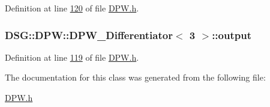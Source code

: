 Definition at line \hyperlink{_d_p_w_8h_source_l00120}{120} of file \hyperlink{_d_p_w_8h_source}{D\+P\+W.\+h}.

\hypertarget{class_d_s_g_1_1_d_p_w_1_1_d_p_w___differentiator_3_013_01_4_a09eeb701309aa1f1034964921417a904}{
\subsubsection[{output}]{ {\bf D\+S\+G\+::\+D\+P\+W\+::\+D\+P\+W\+\_\+\+Differentiator}$<$ 3 $>$\+::output\hspace{0.3cm}{\ttfamily [protected]}}}\label{class_d_s_g_1_1_d_p_w_1_1_d_p_w___differentiator_3_013_01_4_a09eeb701309aa1f1034964921417a904}


Definition at line \hyperlink{_d_p_w_8h_source_l00119}{119} of file \hyperlink{_d_p_w_8h_source}{D\+P\+W.\+h}.



The documentation for this class was generated from the following file\+:\begin{DoxyCompactItemize}
\item 
\hyperlink{_d_p_w_8h}{D\+P\+W.\+h}\end{DoxyCompactItemize}
